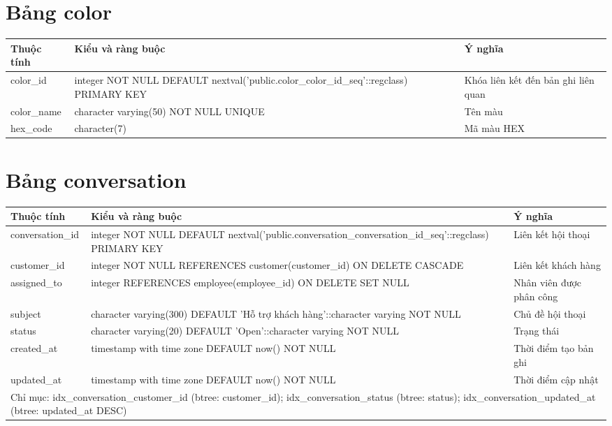 \section{Bảng color}
\begin{longtable}{|p{}|p{}|p{}|}\hline
\textbf{Thuộc tính}&\textbf{Kiểu và ràng buộc}&\textbf{Ý nghĩa}\\\hline\endhead
color\_id & integer NOT NULL DEFAULT nextval('public.color\_color\_id\_seq'::regclass) PRIMARY KEY & Khóa liên kết đến bản ghi liên quan\\\hline
color\_name & character varying(50) NOT NULL UNIQUE & Tên màu\\\hline
hex\_code & character(7) & Mã màu HEX\\\hline
\end{longtable}
\normalsize
\section{Bảng conversation}
\begin{longtable}{|p{}|p{}|p{}|}\hline
\textbf{Thuộc tính}&\textbf{Kiểu và ràng buộc}&\textbf{Ý nghĩa}\\\hline\endhead
conversation\_id & integer NOT NULL DEFAULT nextval('public.conversation\_conversation\_id\_seq'::regclass) PRIMARY KEY & Liên kết hội thoại\\\hline
customer\_id & integer NOT NULL REFERENCES customer(customer\_id) ON DELETE CASCADE & Liên kết khách hàng\\\hline
assigned\_to & integer REFERENCES employee(employee\_id) ON DELETE SET NULL & Nhân viên được phân công\\\hline
subject & character varying(300) DEFAULT 'Hỗ trợ khách hàng'::character varying NOT NULL & Chủ đề hội thoại\\\hline
status & character varying(20) DEFAULT 'Open'::character varying NOT NULL & Trạng thái\\\hline
created\_at & timestamp with time zone DEFAULT now() NOT NULL & Thời điểm tạo bản ghi\\\hline
updated\_at & timestamp with time zone DEFAULT now() NOT NULL & Thời điểm cập nhật\\\hline
\multicolumn{3}{|p{0.93\textwidth}|}{Chỉ mục: idx\_conversation\_customer\_id (btree: customer\_id); idx\_conversation\_status (btree: status); idx\_conversation\_updated\_at (btree: updated\_at DESC)}\\\hline
\end{longtable}
\normalsize
